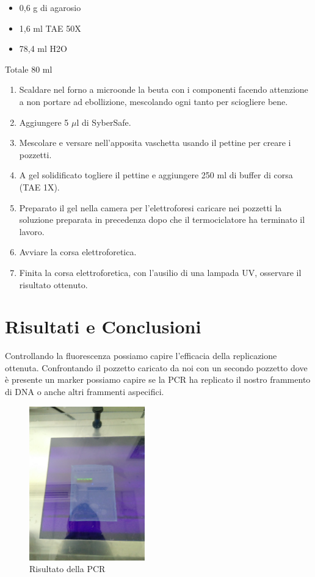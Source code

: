 \begin{itemize}
	\item 0,6 g  di agarosio
	\item 1,6  ml TAE 50X
	\item 78,4 ml H2O
\end{itemize}

Totale 80 ml
\begin{enumerate}
\item Scaldare nel forno a microonde la beuta con i componenti facendo attenzione a
non portare ad ebollizione, mescolando ogni tanto per sciogliere bene.
\item Aggiungere 5 $\mu$l di SyberSafe.
\item Mescolare e versare nell’apposita vaschetta
usando il pettine per creare i pozzetti.
\item A gel solidificato togliere il pettine e
aggiungere 250 ml di buffer di corsa (TAE 1X).

\item Preparato il gel nella camera per l’elettroforesi caricare nei pozzetti la
soluzione preparata in precedenza dopo che il termociclatore ha terminato il
lavoro.
\item Avviare la corsa elettroforetica.

\item Finita la corsa elettroforetica, con l’ausilio di una lampada UV, osservare il
risultato ottenuto.

\end{enumerate}


\section{Risultati e Conclusioni}

Controllando la fluorescenza possiamo capire l'efficacia della replicazione
ottenuta. Confrontando il pozzetto caricato da noi con un secondo pozzetto
dove è presente un marker possiamo capire se la PCR ha replicato il nostro
frammento di DNA o anche altri frammenti aspecifici.

\begin{figure}[htbp]
	\includegraphics[width=50mm]{./immagini/risultato_pcr.jpg}
	\caption{Risultato della PCR}
	\label{risultato_pcr}
\end{figure}
